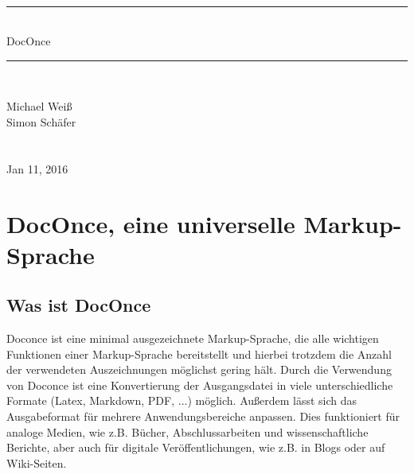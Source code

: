 \documentclass[%
oneside,                 %
final,                   %
chapterprefix=true,      %
open=right,              %
10pt]{book}
\begin{document}






\thispagestyle{empty}
\hbox{\ \ }
\vfill
\begin{center}
{\huge{\bfseries{
\begin{spacing}{1.25}
{\rule{\linewidth}{0.5mm}} \\[0.4cm]
{DocOnce}
\\[0.4cm] {\rule{\linewidth}{0.5mm}} \\[1.5cm]
\end{spacing}
}}}


\vspace{0.5cm}

{\Large\textsf{Michael Weiß${}^{}$}}\\ [3mm]

{\Large\textsf{Simon Schäfer${}^{}$}}\\ [3mm]

\ \\ [2mm]


\ \\ [10mm]
{\large\textsf{Jan 11, 2016}}

\end{center}
\vfill
\clearpage

\tableofcontents


\vspace{1cm} %




\chapter{DocOnce, eine universelle Markup-Sprache}
\section{Was ist DocOnce}
Doconce ist eine minimal ausgezeichnete Markup-Sprache, die alle wichtigen Funktionen einer Markup-Sprache bereitstellt und hierbei trotzdem die Anzahl der verwendeten Auszeichnungen möglichst gering hält. Durch die Verwendung von Doconce ist eine Konvertierung der Ausgangsdatei in viele unterschiedliche Formate (Latex, Markdown, PDF, ...) möglich. Außerdem lässt sich das Ausgabeformat für mehrere Anwendungsbereiche anpassen. Dies funktioniert für analoge Medien, wie z.B. Bücher, Abschlussarbeiten und wissenschaftliche Berichte, aber auch für digitale Veröffentlichungen, wie z.B. in Blogs oder auf Wiki-Seiten.
\end{document}
